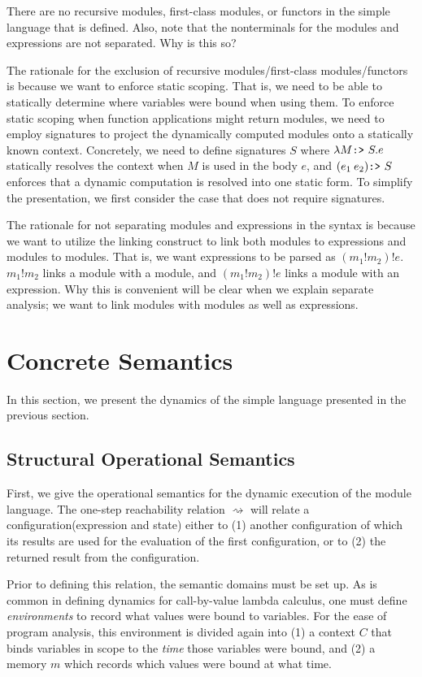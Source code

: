 \documentclass[acmsmall,review]{acmart}\settopmatter{printfolios=true,printccs=false,printacmref=false}
\theoremstyle{definition}
\newcommand*{\mem}{m}
\newcommand*{\link}[2]{{#1}\mathtt{!}{#2}}
\newcommand*{\project}{\text{\texttt{:>} }}
\begin{document}
There are no recursive modules, first-class modules, or functors in the simple language that is defined.
Also, note that the nonterminals for the modules and expressions are not separated. Why is this so?

The rationale for the exclusion of recursive modules/first-class modules/functors is because we want to enforce static scoping.
That is, we need to be able to statically determine where variables were bound when using them.
To enforce static scoping when function applications might return modules, we need to employ signatures to project the dynamically computed modules onto a statically known context.
Concretely, we need to define signatures $S$ where $\lambda M\project S.e$ statically resolves the context when $M$ is used in the body $e$, and $(e_1\:e_2)\project S$ enforces that a dynamic computation is resolved into one static form.
To simplify the presentation, we first consider the case that does not require signatures.

The rationale for not separating modules and expressions in the syntax is because we want to utilize the linking construct to link both modules to expressions and modules to modules.
That is, we want expressions to be parsed as $(m_1!m_2)!e$.
$\link{m_1}{m_2}$ links a module with a module, and $(m_1!m_2)!e$ links a module with an expression.
Why this is convenient will be clear when we explain separate analysis; we want to link modules with modules as well as expressions.

\section{Concrete Semantics}

In this section, we present the dynamics of the simple language presented in the previous section.

\subsection{Structural Operational Semantics}

First, we give the operational semantics for the dynamic execution of the module language.
The one-step reachability relation $\rightsquigarrow$ will relate a configuration(expression and state) either to (1) another configuration of which its results are used for the evaluation of the first configuration, or to (2) the returned result from the configuration.

Prior to defining this relation, the semantic domains must be set up.
As is common in defining dynamics for call-by-value lambda calculus, one must define \emph{environments} to record what values were bound to variables.
For the ease of program analysis, this environment is divided again into (1) a context $C$ that binds variables in scope to the \emph{time} those variables were bound, and (2) a memory $\mem$ which records which values were bound at what time.
\end{document}
